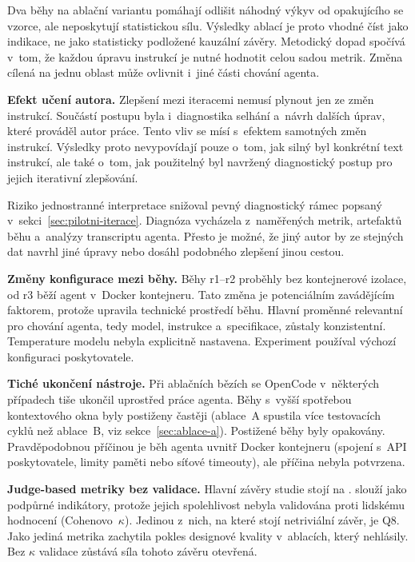 Dva běhy na ablační variantu pomáhají odlišit náhodný výkyv od
opakujícího se vzorce, ale neposkytují statistickou sílu. Výsledky
ablací je proto vhodné číst jako indikace, ne jako statisticky
podložené kauzální závěry. Metodický dopad spočívá v~tom, že každou
úpravu instrukcí je nutné hodnotit celou sadou metrik. Změna cílená
na jednu oblast může ovlivnit i~jiné části chování agenta.

\textbf{Efekt učení autora.}
Zlepšení mezi iteracemi nemusí plynout jen ze změn instrukcí.
Součástí postupu byla i~diagnostika selhání a~návrh dalších úprav,
které prováděl autor práce. Tento vliv se mísí s~efektem samotných
změn instrukcí. Výsledky proto nevypovídají pouze o~tom, jak
silný byl konkrétní text instrukcí, ale také o~tom, jak použitelný byl
navržený diagnostický postup pro jejich iterativní zlepšování.

Riziko jednostranné interpretace snižoval pevný diagnostický rámec
popsaný v~sekci~\ref{sec:pilotni-iterace}. Diagnóza vycházela
z~naměřených metrik, artefaktů běhu a~analýzy transcriptu agenta.
Přesto je možné, že jiný autor by ze stejných dat navrhl jiné
úpravy nebo dosáhl podobného zlepšení jinou cestou.

\textbf{Změny konfigurace mezi běhy.}
Běhy r1--r2 proběhly bez kontejnerové izolace, od r3 běží agent
v~Docker kontejneru. Tato změna je potenciálním zavádějícím faktorem,
protože upravila technické prostředí běhu. Hlavní proměnné relevantní
pro chování agenta, tedy model, instrukce a~specifikace, zůstaly
konzistentní. Temperature modelu nebyla explicitně nastavena.
Experiment používal výchozí konfiguraci poskytovatele.

\textbf{Tiché ukončení nástroje.}
Při ablačních bězích se OpenCode v~některých případech tiše
ukončil uprostřed práce agenta. Běhy s~vyšší spotřebou
kontextového okna byly postiženy častěji (ablace~A spustila více
testovacích cyklů než ablace~B, viz sekce~\ref{sec:ablace-a}). Postižené běhy
byly opakovány. Pravděpodobnou příčinou je běh agenta uvnitř
Docker kontejneru (spojení s~API poskytovatele, limity paměti
nebo síťové timeouty), ale příčina nebyla potvrzena.



\textbf{Judge-based metriky bez validace.}
Hlavní závěry studie stojí na .  slouží
jako podpůrné indikátory, protože jejich spolehlivost nebyla
validována proti lidskému hodnocení (Cohenovo~$\kappa$). Jedinou
z~nich, na které stojí netriviální závěr, je \ac{Q8}. Jako jediná
metrika zachytila pokles designové kvality v~ablacích, který
 nehlásily. Bez $\kappa$ validace zůstává síla tohoto
závěru otevřená.

